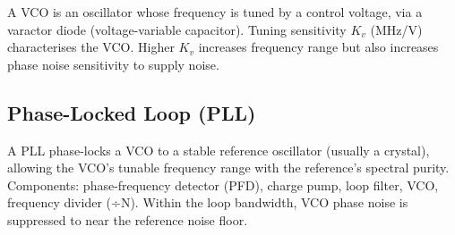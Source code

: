 				

A VCO is an oscillator whose frequency is tuned by a control voltage, via a varactor diode (voltage-variable capacitor). Tuning sensitivity $K_v$ (MHz/V) characterises the VCO. Higher $K_v$ increases frequency range but also increases phase noise sensitivity to supply noise.

				

\subsection{Phase-Locked Loop (PLL)}

				


				

A PLL phase-locks a VCO to a stable reference oscillator (usually a crystal), allowing the VCO's tunable frequency range with the reference's spectral purity. Components: phase-frequency detector (PFD), charge pump, loop filter, VCO, frequency divider (÷N). Within the loop bandwidth, VCO phase noise is suppressed to near the reference noise floor.



